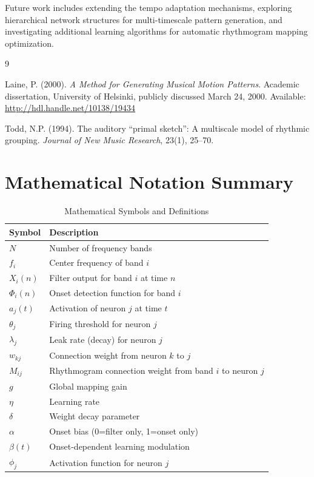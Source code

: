 \documentclass[11pt,a4paper]{article}
\begin{document}
Future work includes extending the tempo adaptation mechanisms, exploring hierarchical network structures for multi-timescale pattern generation, and investigating additional learning algorithms for automatic rhythmogram mapping optimization.

\begin{thebibliography}{9}

Laine, P. (2000). 
\textit{A Method for Generating Musical Motion Patterns}. 
Academic dissertation, University of Helsinki, publicly discussed March 24, 2000. 
Available: \url{http://hdl.handle.net/10138/19434}

Todd, N.P. (1994). 
The auditory ``primal sketch'': A multiscale model of rhythmic grouping. 
\textit{Journal of New Music Research}, 23(1), 25--70.

\end{thebibliography}

\appendix

\section{Mathematical Notation Summary}

\begin{table}[h]
\centering
\caption{Mathematical Symbols and Definitions}
\begin{tabular}{@{}ll@{}}
\toprule
Symbol & Description \\ \midrule
$N$ & Number of frequency bands \\
$f_i$ & Center frequency of band $i$ \\
$X_i(n)$ & Filter output for band $i$ at time $n$ \\
$\Phi_i(n)$ & Onset detection function for band $i$ \\
$a_j(t)$ & Activation of neuron $j$ at time $t$ \\
$\theta_j$ & Firing threshold for neuron $j$ \\
$\lambda_j$ & Leak rate (decay) for neuron $j$ \\
$w_{kj}$ & Connection weight from neuron $k$ to $j$ \\
$M_{ij}$ & Rhythmogram connection weight from band $i$ to neuron $j$ \\
$g$ & Global mapping gain \\
$\eta$ & Learning rate \\
$\delta$ & Weight decay parameter \\
$\alpha$ & Onset bias (0=filter only, 1=onset only) \\
$\beta(t)$ & Onset-dependent learning modulation \\
$\phi_j$ & Activation function for neuron $j$ \\ \bottomrule
\end{tabular}
\end{table}
\end{document}

